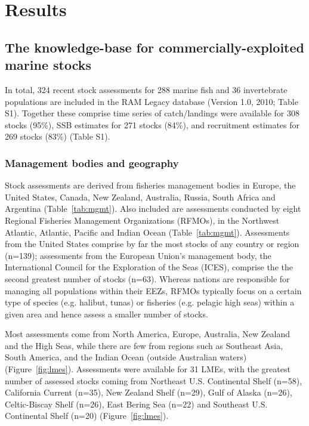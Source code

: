 \newpage
\section*{Results}
\subsection*{The knowledge-base for commercially-exploited marine stocks}
In total, 324 recent stock assessments for
288 marine fish and 36
invertebrate populations are included in the RAM Legacy database
(Version 1.0, 2010; Table S1). Together these comprise time series of
catch/landings were available for 308 stocks (95\%),
SSB estimates for 271 stocks (84\%), and recruitment estimates for
269 stocks (83\%) (Table S1).

\subsubsection*{Management bodies and geography}
Stock assessments are derived from fisheries management bodies in
Europe, the United States, Canada, New Zealand, Australia, Russia,
South Africa and Argentina (Table~\ref{tab:mgmt}). Also included are
assessments conducted by eight Regional Fisheries Management
Organizations (RFMOs), in the Northwest Atlantic, Atlantic, Pacific
and Indian Ocean (Table~\ref{tab:mgmt}). Assessments from the United
States comprise by far the most stocks of any country or region
(n=139); assessments from the European Union's
management body, the International Council for the Exploration of the
Seas (ICES), comprise the the second greatest number of stocks
(n=63).  Whereas nations are responsible for
managing all populations within their EEZs, RFMOs typically focus on a
certain type of species (e.g.  halibut, tunas) or fisheries (e.g.
pelagic high seas) within a given area and hence assess a smaller
number of stocks.

Most assessments come from North America, Europe, Australia, New
Zealand and the High Seas, while there are few from regions such as
Southeast Asia, South America, and the Indian Ocean (outside
Australian waters) (Figure~\ref{fig:lmes}). Assessments were available for 31 LMEs, with the greatest number of
assessed stocks coming from Northeast U.S. Continental Shelf (n=58),
California Current (n=35), New Zealand Shelf (n=29),
Gulf of Alaska (n=26), Celtic-Biscay Shelf (n=26), East Bering Sea (n=22)
and Southeast U.S. Continental Shelf (n=20) (Figure~\ref{fig:lmes}).

